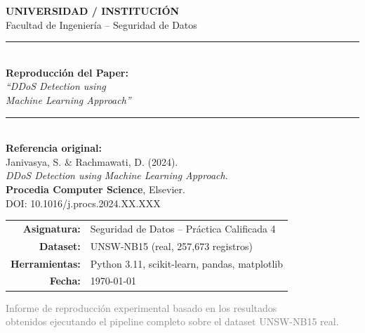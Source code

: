 \documentclass[12pt,a4paper]{article}
\begin{document}
\begin{titlepage}
    \centering
    \vspace*{1cm}


    {\Large \textcolor{azulUNSW}{\textbf{UNIVERSIDAD / INSTITUCIÓN}}}\\[0.3cm]
    {\large Facultad de Ingeniería -- Seguridad de Datos}\\[2cm]

    \rule{\linewidth}{2pt}\\[0.5cm]
    {\Huge \textbf{Reproducción del Paper:}}\\[0.4cm]
    {\LARGE \textcolor{azulUNSW}{\textit{``DDoS Detection using\\[0.2cm]
    Machine Learning Approach''}}}\\[0.4cm]
    \rule{\linewidth}{2pt}\\[1cm]

    {\large \textbf{Referencia original:}}\\[0.2cm]
    {\normalsize Janivasya, S. \& Rachmawati, D. (2024).\\
    \textit{DDoS Detection using Machine Learning Approach}.\\
    \textbf{Procedia Computer Science}, Elsevier.\\
    DOI: 10.1016/j.procs.2024.XX.XXX}\\[2cm]

    \begin{tabular}{rl}
        \textbf{Asignatura:}  & Seguridad de Datos -- Práctica Calificada 4 \\[0.3cm]
        \textbf{Dataset:}     & UNSW-NB15 (real, 257{,}673 registros)       \\[0.3cm]
        \textbf{Herramientas:}& Python 3.11, scikit-learn, pandas, matplotlib\\[0.3cm]
        \textbf{Fecha:}       & \today                                       \\
    \end{tabular}

    \vfill
    {\small \textcolor{gray}{Informe de reproducción experimental basado en los resultados\\
    obtenidos ejecutando el pipeline completo sobre el dataset UNSW-NB15 real.}}
\end{titlepage}
\end{document}
